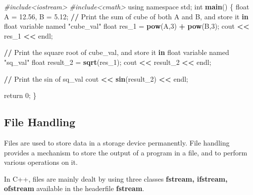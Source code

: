 \documentclass[
]{article}
\newenvironment{Shaded}{\begin{snugshade}}{\end{snugshade}}
\newcommand{\CommentTok}[1]{\textcolor[rgb]{0.56,0.35,0.01}{\textit{#1}}}
\newcommand{\ControlFlowTok}[1]{\textcolor[rgb]{0.13,0.29,0.53}{\textbf{#1}}}
\newcommand{\DecValTok}[1]{\textcolor[rgb]{0.00,0.00,0.81}{#1}}
\newcommand{\ErrorTok}[1]{\textcolor[rgb]{0.64,0.00,0.00}{\textbf{#1}}}
\newcommand{\FloatTok}[1]{\textcolor[rgb]{0.00,0.00,0.81}{#1}}
\newcommand{\FunctionTok}[1]{\textcolor[rgb]{0.13,0.29,0.53}{\textbf{#1}}}
\newcommand{\NormalTok}[1]{#1}
\newcommand{\OtherTok}[1]{\textcolor[rgb]{0.56,0.35,0.01}{#1}}
\newcommand{\SpecialCharTok}[1]{\textcolor[rgb]{0.81,0.36,0.00}{\textbf{#1}}}
\newcommand{\StringTok}[1]{\textcolor[rgb]{0.31,0.60,0.02}{#1}}
\begin{document}
\begin{Shaded}
\begin{Highlighting}[]
\CommentTok{\#include\textless{}iostream\textgreater{}}
\CommentTok{\#include\textless{}cmath\textgreater{}}
\NormalTok{using namespace std;}
\NormalTok{int }\FunctionTok{main}\NormalTok{()  \{}
\NormalTok{    float A }\OtherTok{=} \FloatTok{12.56}\NormalTok{, B }\OtherTok{=} \FloatTok{5.12}\NormalTok{;}
    \SpecialCharTok{/}\ErrorTok{/}\NormalTok{ Print the sum of cube of both A and B, and store it }\ControlFlowTok{in}\NormalTok{ float variable named }\StringTok{"cube\_val"}
\NormalTok{    float res\_1 }\OtherTok{=} \FunctionTok{pow}\NormalTok{(A,}\DecValTok{3}\NormalTok{) }\SpecialCharTok{+} \FunctionTok{pow}\NormalTok{(B,}\DecValTok{3}\NormalTok{);}
\NormalTok{    cout }\SpecialCharTok{\textless{}}\ErrorTok{\textless{}}\NormalTok{  res\_1 }\SpecialCharTok{\textless{}}\ErrorTok{\textless{}}\NormalTok{ endl;}
    
    \SpecialCharTok{/}\ErrorTok{/}\NormalTok{ Print the square root of cube\_val, and store it }\ControlFlowTok{in}\NormalTok{ float variable named }\StringTok{"sq\_val"}
\NormalTok{    float result\_2 }\OtherTok{=} \FunctionTok{sqrt}\NormalTok{(res\_1);}
\NormalTok{    cout }\SpecialCharTok{\textless{}}\ErrorTok{\textless{}}\NormalTok{ result\_2 }\SpecialCharTok{\textless{}}\ErrorTok{\textless{}}\NormalTok{ endl;}
    
    \SpecialCharTok{/}\ErrorTok{/}\NormalTok{ Print the sin of sq\_val}
\NormalTok{    cout }\SpecialCharTok{\textless{}}\ErrorTok{\textless{}} \FunctionTok{sin}\NormalTok{(result\_2) }\SpecialCharTok{\textless{}}\ErrorTok{\textless{}}\NormalTok{ endl;}
    
\NormalTok{    return }\DecValTok{0}\NormalTok{;}
\NormalTok{\}}
\end{Highlighting}
\end{Shaded}

\subsection{File Handling}\label{file-handling}

Files are used to store data in a storage device permanently. File
handling provides a mechanism to store the output of a program in a
file, and to perform various operations on it.

In C++, files are mainly dealt by using three classes \textbf{fstream,
ifstream, ofstream} available in the headerfile \textbf{fstream}.
\end{document}
